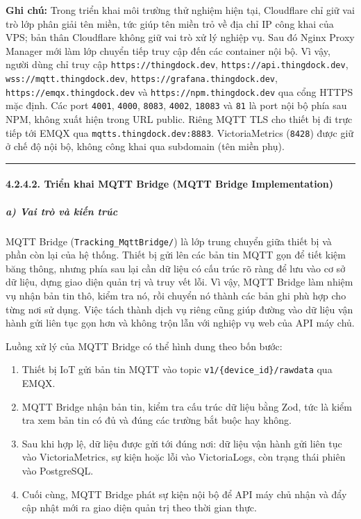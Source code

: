 \documentclass[a4paper]{extarticle}
\providecommand{\tightlist}{%
  \setlength{\itemsep}{0pt}\setlength{\parskip}{0pt}}
\begin{document}
\textbf{Ghi chú:} Trong triển khai môi trường thử nghiệm hiện tại, Cloudflare chỉ giữ vai
trò lớp phân giải tên miền, tức giúp tên miền trỏ về địa chỉ IP công khai của VPS;
bản thân Cloudflare không giữ vai trò xử lý nghiệp vụ. Sau đó Nginx Proxy Manager mới làm lớp chuyển tiếp truy cập đến các container nội
bộ. Vì vậy, người dùng chỉ truy
cập \texttt{https://thingdock.dev}, \texttt{https://api.thingdock.dev},
\texttt{wss://mqtt.thingdock.dev}, \texttt{https://grafana.thingdock.dev},
\texttt{https://emqx.thingdock.dev} và \texttt{https://npm.thingdock.dev}
qua cổng HTTPS mặc định. Các port \texttt{4001}, \texttt{4000},
\texttt{8083}, \texttt{4002}, \texttt{18083} và \texttt{81} là port nội
bộ phía sau NPM, không xuất hiện trong URL public. Riêng MQTT TLS cho
thiết bị đi trực tiếp tới EMQX qua \texttt{mqtts.thingdock.dev:8883}.
VictoriaMetrics (\texttt{8428}) được giữ ở chế độ nội bộ, không công khai
qua subdomain (tên miền phụ).


\begin{center}\rule{0.5\linewidth}{0.5pt}\end{center}

\paragraph{4.2.4.2. Triển khai MQTT Bridge (MQTT Bridge
Implementation)}\label{4242-triux1ec3n-khai-mqtt-bridge-mqtt-bridge-implementation}

\subparagraph{a) Vai trò và kiến
trúc}\label{a-vai-truxf2-vuxe0-kiux1ebfn-truxfac}

MQTT Bridge (\texttt{Tracking\_MqttBridge/}) là lớp trung chuyển giữa
thiết bị và phần còn lại của hệ thống. Thiết bị gửi lên các bản tin MQTT
gọn để tiết kiệm băng thông, nhưng phía sau lại cần dữ liệu có cấu trúc
rõ ràng để lưu vào cơ sở dữ liệu, dựng giao diện quản trị và truy vết lỗi. Vì
vậy, MQTT Bridge làm nhiệm vụ nhận bản tin thô, kiểm tra nó, rồi chuyển
nó thành các bản ghi phù hợp cho từng nơi sử dụng. Việc tách thành dịch
vụ riêng cũng giúp đường vào dữ liệu vận hành gửi liên tục gọn hơn và không trộn lẫn với
nghiệp vụ web của API máy chủ.

Luồng xử lý của MQTT Bridge có thể hình dung theo bốn bước:

\begin{enumerate}
\tightlist
\item
  Thiết bị IoT gửi bản tin MQTT vào topic
  \texttt{v1/\{device\_id\}/rawdata} qua EMQX.
\item
  MQTT Bridge nhận bản tin, kiểm tra cấu trúc dữ liệu bằng Zod, tức là
  kiểm tra xem bản tin có đủ và đúng các trường bắt buộc hay không.
\item
  Sau khi hợp lệ, dữ liệu được gửi tới đúng nơi: dữ liệu vận hành gửi liên tục vào
  VictoriaMetrics, sự kiện hoặc lỗi vào VictoriaLogs, còn trạng thái
  phiên vào PostgreSQL.
\item
  Cuối cùng, MQTT Bridge phát sự kiện nội bộ để API máy chủ nhận và đẩy cập
  nhật mới ra giao diện quản trị theo thời gian thực.
\end{enumerate}
\end{document}
